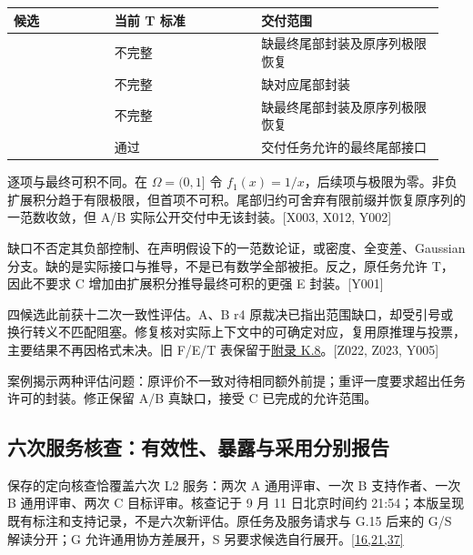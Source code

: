 \begingroup\small\setlength{\tabcolsep}{3pt}\renewcommand{\arraystretch}{1.14}
\par\nopagebreak\medskip\noindent\begin{minipage}[t]{\linewidth}
\begin{tabular}{>{\raggedright\arraybackslash}p{0.22\linewidth}>{\raggedright\arraybackslash}p{0.32\linewidth}>{\raggedright\arraybackslash}p{0.4\linewidth}}
\toprule
\textbf{候选} & \textbf{当前 T 标准} & \textbf{交付范围}\\\midrule

{A} & {不完整} & {缺最终尾部封装及原序列极限恢复}\\
{早期 B} & {不完整} & {缺对应尾部封装}\\
{B r4} & {不完整} & {缺最终尾部封装及原序列极限恢复}\\
{C} & {通过} & {交付任务允许的最终尾部接口}\\
\bottomrule\end{tabular}\end{minipage}\par\medskip\endgroup
逐项与最终可积不同。在 $\Omega=(0,1]$ 令 $f_1(x)=1/x$，后续项与极限为零。非负扩展积分趋于有限极限，但首项不可积。尾部归约可舍弃有限前缀并恢复原序列的一范数收敛，但 A/B 实际公开交付中无该封装。[X003, X012, Y002]

缺口不否定其负部控制、在声明假设下的一范数论证，或密度、全变差、Gaussian 分支。缺的是实际接口与推导，不是已有数学全部被拒。反之，原任务允许 T，因此不要求 C 增加由扩展积分推导最终可积的更强 E 封装。[Y001]

四候选此前获十二次一致性评估。A、B r4 原裁决已指出范围缺口，却受引号或换行转义不匹配阻塞。修复核对实际上下文中的可确定对应，复用原推理与投票，主要结果不再因格式未决。旧 F/E/T 表保留于\hyperlink{k8}{附录 K.8}。[Z022, Z023, Y005]

案例揭示两种评估问题：原评价不一致对待相同额外前提；重评一度要求超出任务许可的封装。修正保留 A/B 真缺口，接受 C 已完成的允许范围。

\subsection[六次服务核查：有效性、暴露与采用分别报告]{\texorpdfstring{\protect\hypertarget{g18}{}六次服务核查：有效性、暴露与采用分别报告}{六次服务核查：有效性、暴露与采用分别报告}}
保存的定向核查恰覆盖六次 L2 服务：两次 A 通用评审、一次 B 支持作者、一次 B 通用评审、两次 C 目标评审。核查记于 9 月 11 日北京时间约 21:54；本版呈现既有标注和支持记录，不是六次新评估。原任务及服务请求与 G.15 后来的 G/S 解读分开；G 允许通用协方差展开，S 另要求候选自行展开。\href{zh.pdf\#ref-16}{\mbox{[16,21,37]}}


